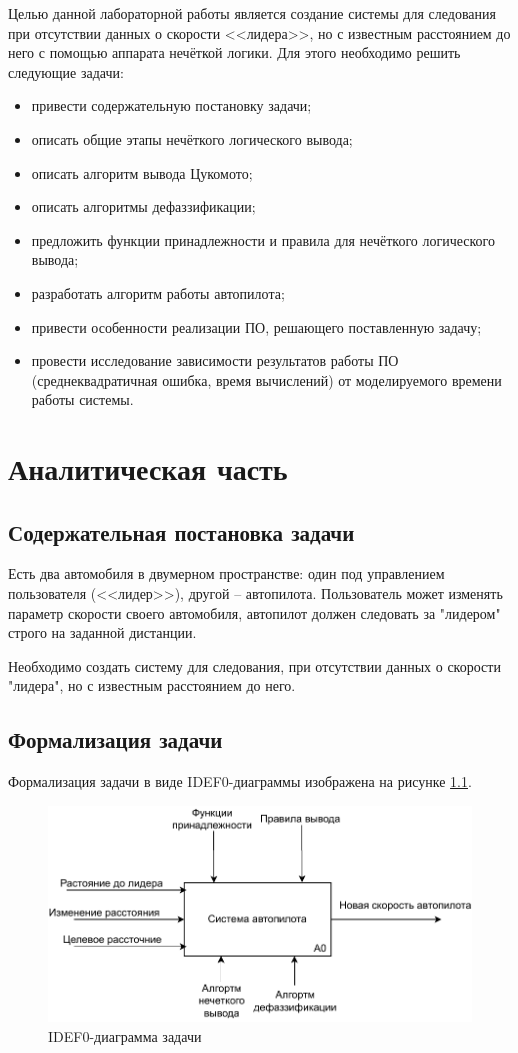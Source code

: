 \documentclass[12pt]{report}
\begin{document}
Целью данной лабораторной работы является создание системы для следования при отсутствии данных о скорости <<лидера>>, но с известным расстоянием до него с помощью аппарата нечёткой логики.
Для этого необходимо решить следующие задачи:
\begin{itemize}
    \item привести содержательную постановку задачи;
    \item описать общие этапы нечёткого логического вывода;
    \item описать алгоритм вывода Цукомото;
    \item описать алгоритмы дефаззификации;
    \item предложить функции принадлежности и правила для нечёткого логического вывода;
    \item разработать алгоритм работы автопилота;
    \item привести особенности реализации ПО, решающего поставленную задачу;
    \item провести исследование зависимости результатов работы ПО (среднеквадратичная ошибка, время вычислений) от моделируемого времени работы системы.
\end{itemize}

\chapter{Аналитическая часть}

\section{Содержательная постановка задачи}
Есть два автомобиля в двумерном пространстве: один под управлением пользователя (<<лидер>>), другой -- автопилота.
Пользователь может изменять параметр скорости своего автомобиля, автопилот должен следовать за "лидером" строго на заданной дистанции.

Необходимо создать систему для следования, при отсутствии данных о скорости "лидера", но с известным расстоянием до него.

\section{Формализация задачи}

Формализация задачи в виде IDEF0-диаграммы изображена на рисунке \ref{fig:idef0}.

\begin{figure}[h]
  \centering
  \includegraphics[scale = 1]{idef0.pdf}
  \caption{IDEF0-диаграмма задачи}
  \label{fig:idef0}
\end{figure}
\end{document}
